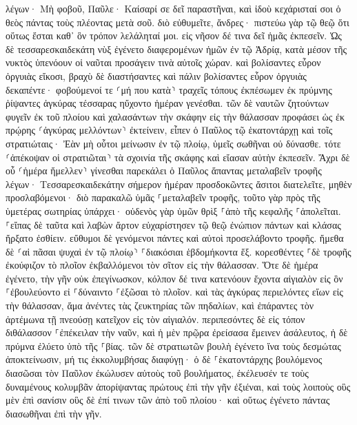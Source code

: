 \documentclass[twoside, 9pt]{extreport}
\begin{document}
λέγων· Μὴ φοβοῦ, Παῦλε· Καίσαρί σε δεῖ παραστῆναι, καὶ ἰδοὺ κεχάρισταί σοι ὁ θεὸς πάντας τοὺς πλέοντας μετὰ σοῦ. 
διὸ εὐθυμεῖτε, ἄνδρες· πιστεύω γὰρ τῷ θεῷ ὅτι οὕτως ἔσται καθ᾽ ὃν τρόπον λελάληταί μοι. 
εἰς νῆσον δέ τινα δεῖ ἡμᾶς ἐκπεσεῖν. 
Ὡς δὲ τεσσαρεσκαιδεκάτη νὺξ ἐγένετο διαφερομένων ἡμῶν ἐν τῷ Ἀδρίᾳ, κατὰ μέσον τῆς νυκτὸς ὑπενόουν οἱ ναῦται προσάγειν τινὰ αὐτοῖς χώραν. 
καὶ βολίσαντες εὗρον ὀργυιὰς εἴκοσι, βραχὺ δὲ διαστήσαντες καὶ πάλιν βολίσαντες εὗρον ὀργυιὰς δεκαπέντε· 
φοβούμενοί τε ⸂μή που κατὰ⸃ τραχεῖς τόπους ἐκπέσωμεν ἐκ πρύμνης ῥίψαντες ἀγκύρας τέσσαρας ηὔχοντο ἡμέραν γενέσθαι. 
τῶν δὲ ναυτῶν ζητούντων φυγεῖν ἐκ τοῦ πλοίου καὶ χαλασάντων τὴν σκάφην εἰς τὴν θάλασσαν προφάσει ὡς ἐκ πρῴρης ⸂ἀγκύρας μελλόντων⸃ ἐκτείνειν, 
εἶπεν ὁ Παῦλος τῷ ἑκατοντάρχῃ καὶ τοῖς στρατιώταις· Ἐὰν μὴ οὗτοι μείνωσιν ἐν τῷ πλοίῳ, ὑμεῖς σωθῆναι οὐ δύνασθε. 
τότε ⸂ἀπέκοψαν οἱ στρατιῶται⸃ τὰ σχοινία τῆς σκάφης καὶ εἴασαν αὐτὴν ἐκπεσεῖν. 
Ἄχρι δὲ οὗ ⸂ἡμέρα ἤμελλεν⸃ γίνεσθαι παρεκάλει ὁ Παῦλος ἅπαντας μεταλαβεῖν τροφῆς λέγων· Τεσσαρεσκαιδεκάτην σήμερον ἡμέραν προσδοκῶντες ἄσιτοι διατελεῖτε, μηθὲν προσλαβόμενοι· 
διὸ παρακαλῶ ὑμᾶς ⸀μεταλαβεῖν τροφῆς, τοῦτο γὰρ πρὸς τῆς ὑμετέρας σωτηρίας ὑπάρχει· οὐδενὸς γὰρ ὑμῶν θρὶξ ⸀ἀπὸ τῆς κεφαλῆς ⸀ἀπολεῖται. 
⸀εἴπας δὲ ταῦτα καὶ λαβὼν ἄρτον εὐχαρίστησεν τῷ θεῷ ἐνώπιον πάντων καὶ κλάσας ἤρξατο ἐσθίειν. 
εὔθυμοι δὲ γενόμενοι πάντες καὶ αὐτοὶ προσελάβοντο τροφῆς. 
ἤμεθα δὲ ⸂αἱ πᾶσαι ψυχαὶ ἐν τῷ πλοίῳ⸃ ⸀διακόσιαι ἑβδομήκοντα ἕξ. 
κορεσθέντες ⸀δὲ τροφῆς ἐκούφιζον τὸ πλοῖον ἐκβαλλόμενοι τὸν σῖτον εἰς τὴν θάλασσαν. 
Ὅτε δὲ ἡμέρα ἐγένετο, τὴν γῆν οὐκ ἐπεγίνωσκον, κόλπον δέ τινα κατενόουν ἔχοντα αἰγιαλὸν εἰς ὃν ⸀ἐβουλεύοντο εἰ ⸀δύναιντο ⸀ἐξῶσαι τὸ πλοῖον. 
καὶ τὰς ἀγκύρας περιελόντες εἴων εἰς τὴν θάλασσαν, ἅμα ἀνέντες τὰς ζευκτηρίας τῶν πηδαλίων, καὶ ἐπάραντες τὸν ἀρτέμωνα τῇ πνεούσῃ κατεῖχον εἰς τὸν αἰγιαλόν. 
περιπεσόντες δὲ εἰς τόπον διθάλασσον ⸀ἐπέκειλαν τὴν ναῦν, καὶ ἡ μὲν πρῷρα ἐρείσασα ἔμεινεν ἀσάλευτος, ἡ δὲ πρύμνα ἐλύετο ὑπὸ τῆς ⸀βίας. 
τῶν δὲ στρατιωτῶν βουλὴ ἐγένετο ἵνα τοὺς δεσμώτας ἀποκτείνωσιν, μή τις ἐκκολυμβήσας διαφύγῃ· 
ὁ δὲ ⸀ἑκατοντάρχης βουλόμενος διασῶσαι τὸν Παῦλον ἐκώλυσεν αὐτοὺς τοῦ βουλήματος, ἐκέλευσέν τε τοὺς δυναμένους κολυμβᾶν ἀπορίψαντας πρώτους ἐπὶ τὴν γῆν ἐξιέναι, 
καὶ τοὺς λοιποὺς οὓς μὲν ἐπὶ σανίσιν οὓς δὲ ἐπί τινων τῶν ἀπὸ τοῦ πλοίου· καὶ οὕτως ἐγένετο πάντας διασωθῆναι ἐπὶ τὴν γῆν. 
\end{document}
